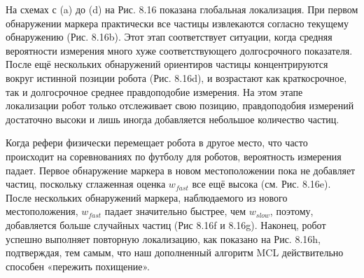 \documentclass[10pt,a4paper]{article}
\begin{document}
На схемах с (a) до (d) на Рис. 8.16 показана глобальная локализация. При первом обнаружении маркера практически все частицы извлекаются согласно текущему обнаружению (Рис. 8.16b). Этот этап соответствует ситуации, когда средняя вероятности измерения много хуже соответствующего долгосрочного показателя. После ещё нескольких обнаружений ориентиров частицы концентрируются вокруг истинной позиции робота (Рис. 8.16d), и возрастают как краткосрочное, так и долгосрочное среднее правдоподобие измерения. На этом этапе локализации робот только отслеживает свою позицию, правдоподобия измерений достаточно высоки и лишь иногда добавляется небольшое количество частиц. 

Когда рефери физически перемещает робота в другое место, что часто происходит на соревнованиях по футболу для роботов, вероятность измерения падает. Первое обнаружение маркера в новом местоположении пока не добавляет частиц, поскольку сглаженная оценка $w_{fast}$ все ещё высока (см. Рис. 8.16e). После нескольких обнаружений маркера, наблюдаемого из нового местоположения, $w_{fast}$ падает значительно быстрее, чем $w_{slow}$, поэтому, добавляется больше случайных частиц (Рис 8.16f и 8.16g). Наконец, робот успешно выполняет повторную локализацию, как показано на Рис. 8.16h, подтверждая, тем самым, что наш дополненный алгоритм MCL действительно способен «пережить похищение».
\end{document}

